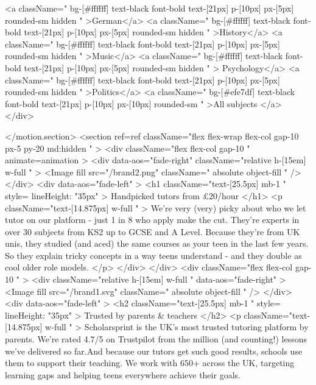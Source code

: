             <a className=" bg-[#ffffff] text-black font-bold text-[21px] p-[10px]  px-[5px] rounded-sm hidden " >German</a>
            <a className=" bg-[#ffffff] text-black font-bold text-[21px] p-[10px]  px-[5px] rounded-sm hidden " >History</a>
            <a className=" bg-[#ffffff] text-black font-bold text-[21px] p-[10px]  px-[5px] rounded-sm hidden " >Music</a>
            <a className=" bg-[#ffffff] text-black font-bold text-[21px] p-[10px]  px-[5px] rounded-sm hidden " > Psychology</a>
            <a className=" bg-[#ffffff] text-black font-bold text-[21px] p-[10px]  px-[5px] rounded-sm hidden " >Politics</a>
            <a className=" bg-[#efe7df] text-black font-bold text-[21px] p-[10px]  px-[10px] rounded-sm  " >All subjects </a>
          </div>

        </motion.section>
        <section ref={ref} className="flex flex-wrap flex-col gap-10 px-5 py-20 md:hidden  "  >
          <div className="flex flex-col gap-10 " animate={animation} >
            <div data-aos="fade-right" className="relative h-[15em] w-full  " >
              <Image
                fill
                src={"/brand2.png"}
                className="  absolute  object-fill "
              />
            </div>
            <div data-aos="fade-left" >
              <h1 className="text-[25.5px] mb-1 " style={{ lineHeight: "35px" }} >
                Handpicked tutors from £20/hour
              </h1>
              <p className="text-[14.875px] w-full  " >
                We're very (very) picky about who we let tutor on our platform - just 1 in 8 who apply make the cut. They're experts in over 30 subjects from KS2 up to GCSE and A Level. Because they're from UK unis, they studied (and aced) the same courses as your teen in the last few years. So they explain tricky concepts in a way teens understand - and they double as cool older role models.
              </p>
            </div>
          </div>
          <div className="flex flex-col gap-10 "  >
            <div className="relative h-[15em] w-full  " data-aos="fade-right" >
              <Image
                fill
                src={"/brand1.svg"}
                className="  absolute  object-fill "
              />
            </div>
            <div data-aos="fade-left" >
              <h2 className="text-[25.5px] mb-1 " style={{ lineHeight: "35px" }} >
                Trusted by parents & teachers
              </h2>
              <p className="text-[14.875px] w-full  " >
                Scholarsprint is the UK's most trusted tutoring platform by parents. We're rated 4.7/5 on Trustpilot from the million (and counting!) lessons we’ve delivered so far.And because our tutors get such good results, schools use them to support their teaching. We work with 650+ across the UK, targeting learning gaps and helping teens everywhere achieve their goals.
